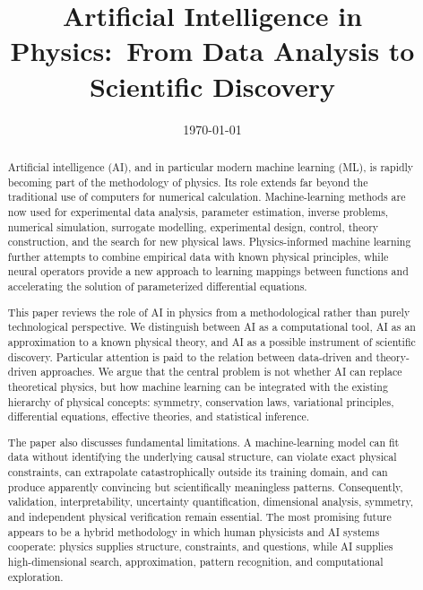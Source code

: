 \documentclass[11pt,a4paper]{article}
\title{\textbf{Artificial Intelligence in Physics:\
From Data Analysis to Scientific Discovery}}
\author{}
\date{\today}
\begin{document}
\maketitle

\begin{abstract}
Artificial intelligence (AI), and in particular modern machine learning (ML), is
rapidly becoming part of the methodology of physics. Its role extends far beyond
the traditional use of computers for numerical calculation. Machine-learning
methods are now used for experimental data analysis, parameter estimation,
inverse problems, numerical simulation, surrogate modelling, experimental
design, control, theory construction, and the search for new physical laws.
Physics-informed machine learning further attempts to combine empirical data
with known physical principles, while neural operators provide a new approach
to learning mappings between functions and accelerating the solution of
parameterized differential equations.

This paper reviews the role of AI in physics from a methodological rather than
purely technological perspective. We distinguish between AI as a computational
tool, AI as an approximation to a known physical theory, and AI as a possible
instrument of scientific discovery. Particular attention is paid to the relation
between data-driven and theory-driven approaches. We argue that the central
problem is not whether AI can replace theoretical physics, but how machine
learning can be integrated with the existing hierarchy of physical concepts:
symmetry, conservation laws, variational principles, differential equations,
effective theories, and statistical inference.

The paper also discusses fundamental limitations. A machine-learning model can
fit data without identifying the underlying causal structure, can violate exact
physical constraints, can extrapolate catastrophically outside its training
domain, and can produce apparently convincing but scientifically meaningless
patterns. Consequently, validation, interpretability, uncertainty quantification,
dimensional analysis, symmetry, and independent physical verification remain
essential. The most promising future appears to be a hybrid methodology in
which human physicists and AI systems cooperate: physics supplies structure,
constraints, and questions, while AI supplies high-dimensional search,
approximation, pattern recognition, and computational exploration.
\end{abstract}
\end{document}
